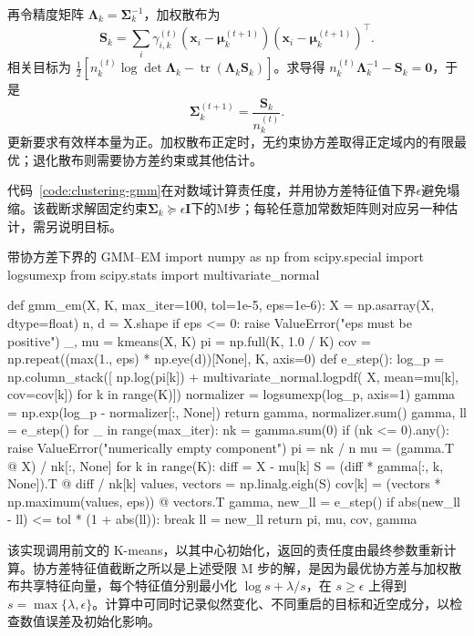 再令精度矩阵 $\bm{\Lambda}_k=\bm{\Sigma}_k^{-1}$，加权散布为
\[
 \bm{S}_k=\sum_i\gamma_{i,k}^{(t)}
 (\bm{x}_i-\bm{\mu}_k^{(t+1)})
 (\bm{x}_i-\bm{\mu}_k^{(t+1)})^\top.
\]
相关目标为 $\tfrac12[n_k^{(t)}\log\det\bm{\Lambda}_k-\operatorname{tr}(\bm{\Lambda}_k\bm{S}_k)]$。求导得 $n_k^{(t)}\bm{\Lambda}_k^{-1}-\bm{S}_k=\bm{0}$，于是
\begin{equation}
 \bm{\Sigma}_k^{(t+1)}
 =\frac{\bm{S}_k}{n_k^{(t)}}.
 \label{eq:clustering-gmm-covariance}
\end{equation}
更新要求有效样本量为正。加权散布正定时，无约束协方差取得正定域内的有限最优；退化散布则需要协方差约束或其他估计。

代码~\ref{code:clustering-gmm}在对数域计算责任度，并用协方差特征值下界$\epsilon$避免塌缩。该截断求解固定约束$\bm{\Sigma}_k\succeq\epsilon\bm{I}$下的M步；每轮任意加常数矩阵则对应另一种估计，需另说明目标。

\begin{codeblock}[language=Python,label={code:clustering-gmm}]{带协方差下界的 GMM--EM}
import numpy as np
from scipy.special import logsumexp
from scipy.stats import multivariate_normal

def gmm_em(X, K, max_iter=100, tol=1e-5, eps=1e-6):
    X = np.asarray(X, dtype=float)
    n, d = X.shape
    if eps <= 0:
        raise ValueError("eps must be positive")
    _, mu = kmeans(X, K)
    pi = np.full(K, 1.0 / K)
    cov = np.repeat((max(1., eps) * np.eye(d))[None], K, axis=0)
    def e_step():
        log_p = np.column_stack([
            np.log(pi[k]) + multivariate_normal.logpdf(
                X, mean=mu[k], cov=cov[k])
            for k in range(K)])
        normalizer = logsumexp(log_p, axis=1)
        gamma = np.exp(log_p - normalizer[:, None])
        return gamma, normalizer.sum()
    gamma, ll = e_step()
    for _ in range(max_iter):
        nk = gamma.sum(0)
        if (nk <= 0).any():
            raise ValueError("numerically empty component")
        pi = nk / n
        mu = (gamma.T @ X) / nk[:, None]
        for k in range(K):
            diff = X - mu[k]
            S = (diff * gamma[:, k, None]).T @ diff / nk[k]
            values, vectors = np.linalg.eigh(S)
            cov[k] = (vectors * np.maximum(values, eps)) @ vectors.T
        gamma, new_ll = e_step()
        if abs(new_ll - ll) <= tol * (1 + abs(ll)):
            break
        ll = new_ll
    return pi, mu, cov, gamma
\end{codeblock}

该实现调用前文的 K-means，以其中心初始化，返回的责任度由最终参数重新计算。协方差特征值截断之所以是上述受限 M 步的解，是因为最优协方差与加权散布共享特征向量，每个特征值分别最小化 $\log s+\lambda/s$，在 $s\geq\epsilon$ 上得到 $s=\max\{\lambda,\epsilon\}$。计算中可同时记录似然变化、不同重启的目标和近空成分，以检查数值误差及初始化影响。

